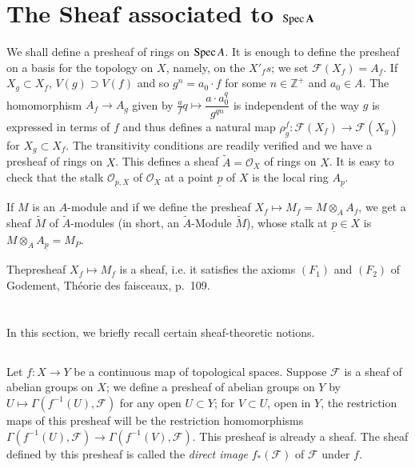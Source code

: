 \setcounter{section}{3}
\section{The Sheaf associated to {$\mathbf{\text{Spec\,}
      A}$}}\label{chap1-sec1.4} 

We shall define a presheaf of rings on $\operatorname{Spec} A$. It is enough to
define the presheaf on a basis for the topology on $X$, namely, on the
$X'_{f}s$; we set $\mathscr{F}(X_{f})=A_{f}$. If $X_{g}\subset X_{f}$,
$V(g)\supset V(f)$ and so $g^{n}=a_{0}\cdot f$ for some
$n\in\mathbb{Z}^{+}$ and $a_{0}\in A$. The homomorphism $A_{f}\to
A_{g}$ given by $\frac{a}{f}q\mapsto \dfrac{a\cdot
  a^{q}_{0}}{g^{qn}}$ is independent of the way $g$ is expressed in
terms of $f$ and thus defines a natural map
$\rho^{f}_{g}:\mathscr{F}(X_{f})\to \mathscr{F}(X_{g})$ for
$X_{g}\subset X_{f}$. The transitivity conditions are readily verified
and we have a presheaf of rings on $X$. This defines a sheaf
$\widetilde{A}=\mathscr{O}_{X}$ of rings on $X$. It is easy to check
that the stalk $\mathscr{O}_{\underline{p},X}$ of $\mathscr{O}_{X}$ at
a point $\underline{p}$ of $X$ is the local ring $A_{\underline{p}}$.

If $M$ is an $A$-module and if we define the presheaf $X_{f}\mapsto
M_{f}=M\otimes_{A}A_{f}$, we get a sheaf $\widetilde{M}$ of
$\widetilde{A}$-modules (in short, an $\widetilde{A}$-Module
$\widetilde{M}$), whose stalk at $\underline{p}\in X$ is
$M\otimes_{A}A_{\underline{p}}=M_{P}$. 

\begin{remark*}
The\pageoriginale presheaf $X_{f}\mapsto M_{f}$ is a sheaf, i.e. it
satisfies the axioms $(F_{1})$ and $(F_{2})$ of Godement, Th\'eorie
des faisceaux, p.~109.
\end{remark*}

\section{}\label{chap1-sec1.5}%
In this section, we briefly recall certain sheaf-theoretic notions.

\subsection{}\label{chap1-sec1.5.1}%
Let $f:X\to Y$ be a continuous map of topological spaces. Suppose
$\mathscr{F}$ is a sheaf of abelian groups on $X$; we define a
presheaf of abelian groups on $Y$ by $U\mapsto
\Gamma(f^{-1}(U),\mathscr{F})$ for any open $U\subset Y$; for
$V\subset U$, open in $Y$, the restriction maps of this presheaf will
be the restriction homomorphisms $\Gamma(f^{-1}(U),\mathscr{F})\to
\Gamma(f^{-1}(V),\mathscr{F})$. This presheaf is already a sheaf. The sheaf
defined by this presheaf is called the {\em direct image}
$f_{\ast}(\mathscr{F})$ of $\mathscr{F}$ under $f$.

